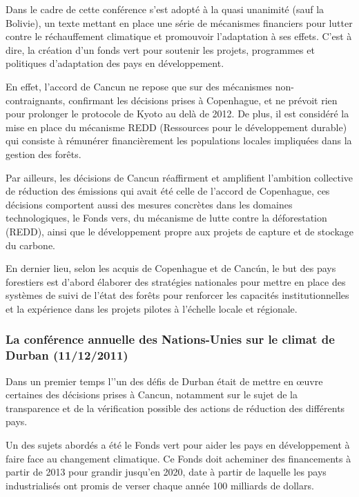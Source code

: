 \documentclass[a4paper,10pt]{article}
\begin{document}
Dans le  cadre de cette  conférence s’est adopté  à la quasi unanimité  (sauf la
Bolivie),  un texte mettant  en place  une série  de mécanismes  financiers pour
lutter  contre le  réchauffement  climatique et  promouvoir  l'adaptation à  ses
effets. C’est  à dire,  la création  d’un fonds vert  pour soutenir  les projets,
programmes et politiques d'adaptation des pays en développement. 


En effet, l'accord de Cancun ne repose que sur des mécanismes non-contraignants,
confirmant  les décisions  prises à  Copenhague,  et ne  prévoit rien  pour
prolonger le protocole  de Kyoto au delà  de 2012. De plus, il  est considéré la
mise en place  du mécanisme REDD (Ressources pour  le développement durable) qui
consiste à  rémunérer financièrement les populations locales  impliquées dans la
gestion des forêts. 


Par  ailleurs, les  décisions  de Cancun  réaffirment  et amplifient  l’ambition
collective  de  réduction des  émissions  qui avait  été  celle  de l’accord  de
Copenhague,  ces  décisions comportent  aussi  des  mesures  concrètes dans  les
domaines  technologiques,  le  Fonds  vers,  du mécanisme  de  lutte  contre  la
déforestation (REDD), ainsi  que le développement propre aux  projets de capture
et de stockage du carbone.


En dernier lieu,  selon les acquis de  Copenhague et de Cancún, le  but des pays
forestiers est d’abord  élaborer des stratégies nationales pour  mettre en place
des  systèmes  de  suivi de  l’état  des  forêts  pour renforcer  les  capacités
institutionnelles et la  expérience dans les projets pilotes  à l’échelle locale
et régionale.


\subsubsection[La  conférence  annuelle  des  Nations-Unies  sur  le  climat  de
Durban]{La  conférence  annuelle  des  Nations-Unies  sur le  climat  de  Durban
  (11/12/2011)} 

Dans  un premier  temps l’'un  des défis  de Durban  était de  mettre  en œuvre
certaines  des  décisions  prises  à  Cancun,  notamment  sur  le  sujet  de  la
transparence  et  de la  vérification  possible  des  actions de  réduction  des
différents pays. 


Un des sujets abordés a été le Fonds vert pour aider les pays en développement à
faire face au changement climatique.  Ce Fonds doit acheminer des financements à
partir de 2013 pour grandir jusqu'en 2020, date à partir de laquelle
les  pays industrialisés  ont promis  de verser  chaque année  100  milliards de
dollars.
\end{document}
